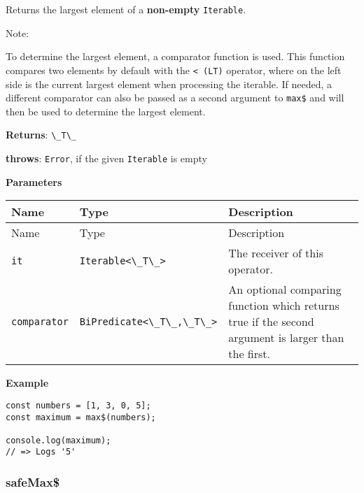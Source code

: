 Returns the largest element of a \textbf{non-empty}
\passthrough{\lstinline!Iterable!}.

Note:

To determine the largest element, a comparator function is used. This
function compares two elements by default with the
\passthrough{\lstinline!< (LT)!} operator, where on the left side is the
current largest element when processing the iterable. If needed, a
different comparator can also be passed as a second argument to
\passthrough{\lstinline!max$!} and will then be used to determine the
largest element.

\textbf{Returns}: \passthrough{\lstinline!\_T\_!}

\textbf{throws}: \passthrough{\lstinline!Error!}, if the given
\passthrough{\lstinline!Iterable!} is empty

\textbf{Parameters}

\begin{longtable}[]{
  >{\raggedright\arraybackslash}p{}
  >{\raggedright\arraybackslash}p{}
  >{\raggedright\arraybackslash}p{}@{}}

\toprule\noalign{}
Name & Type & Description \\
\midrule\noalign{}
\endfirsthead
\toprule\noalign{}
Name & Type & Description \\
\midrule\noalign{}
\endhead
\bottomrule\noalign{}
\endlastfoot
\passthrough{\lstinline!it!} & \passthrough{\lstinline!Iterable<\_T\_>!}
& The receiver of this operator. \\
\passthrough{\lstinline!comparator!} &
\passthrough{\lstinline!BiPredicate<\_T\_,\_T\_>!} & An optional
comparing function which returns true if the second argument is larger
than the first. \\
\end{longtable}

\textbf{Example}

\begin{lstlisting}[label=88fe2a41-ef34-4624-a8a7-c7571e410912]
const numbers = [1, 3, 0, 5];
const maximum = max$(numbers);
                              
console.log(maximum);
// => Logs '5'
\end{lstlisting}

\hypertarget{acc84b7e-1143-48cb-888d-767e0d324309}{%
\subsubsection{safeMax\$}\label{acc84b7e-1143-48cb-888d-767e0d324309}}

